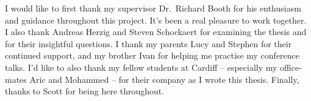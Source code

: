 I would like to first thank my supervisor Dr.\ Richard Booth for his enthusiasm
and guidance throughout this project. It's been a real pleasure to work
together. I also thank Andreas Herzig and Steven Schockaert for examining the
thesis and for their insightful questions. I thank my parents Lucy and Stephen
for their continued support, and my brother Ivan for helping me practise my
conference talks. I'd like to also thank my fellow students at Cardiff --
especially my office-mates Aric and Mohammed -- for their company as I wrote
this thesis. Finally, thanks to Scott for being here throughout.
